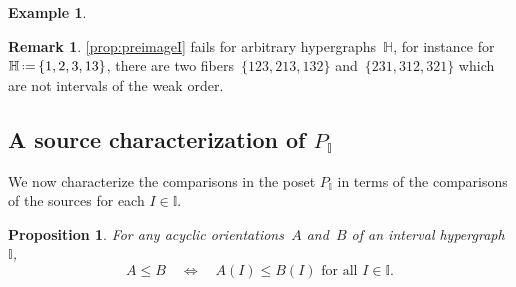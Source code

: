 \documentclass[reqno]{amsart}
\newtheorem{proposition}[theorem]{Proposition}
\theoremstyle{definition}
\newtheorem{example}[theorem]{Example}
\newtheorem{remark}[theorem]{Remark}
\newcommand{\eqdef}{\mbox{\,\raisebox{0.2ex}{\scriptsize\ensuremath{\mathrm:}}\ensuremath{=}\,}} %
\newcommand{\vincent}[1]{\todo[size=\tiny,color=blue!30]{ #1 \\ \hfill --- V.}\,}
\newcommand{\HH}{\mathbb H}  %
\newcommand{\II}{\mathbb I} %
\begin{document}
\begin{example}
\vincent{todo}
\end{example}

\begin{remark}
\cref{prop:preimageI} fails for arbitrary hypergraphs~$\HH$, for instance for~$\HH \eqdef \{1, 2, 3, 13\}$, there are two fibers~$\{123, 213, 132\}$ and~$\{231, 312, 321\}$ which are not intervals of the weak order.
\end{remark}


\subsection{A source characterization of $P_\II$}  
\label{subsec:sourceAcyclicI}

We now characterize the comparisons in the poset $P_\II$ in terms of the comparisons of the sources for each $I\in \II$.

\begin{proposition}
\label{prop:sourceOrderI}
For any acyclic orientations~$A$ and~$B$ of an interval hypergraph~$\II$,
\[
A \le B \quad \iff \quad A(I) \le B(I) \text{ for all } I \in \II .
\]
\end{proposition}
\end{document}
